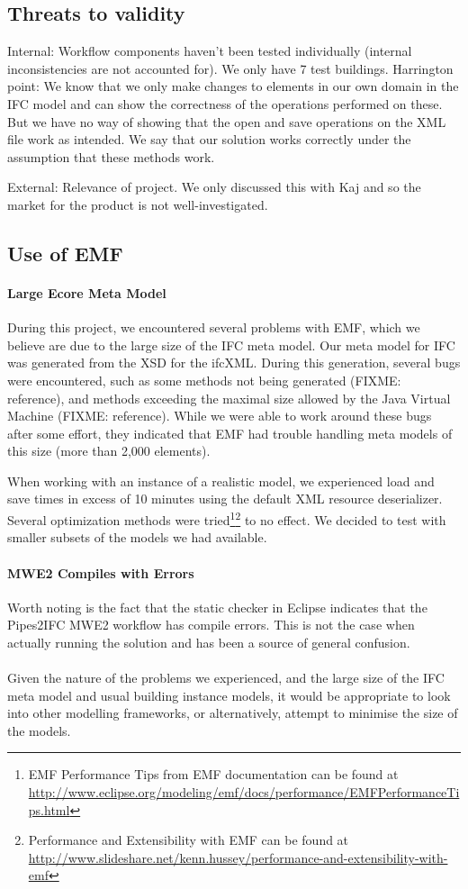 \subsection{Threats to validity}
Internal:
Workflow components haven't been tested individually (internal inconsistencies are not accounted for). We only have 7 test buildings.
Harrington point: We know that we only make changes to elements in our own domain in the IFC model and can show the correctness of the operations performed on these. But we have no way of showing that the open and save operations on the XML file work as intended. We say that our solution works correctly under the assumption that these methods work.

External:
Relevance of project. We only discussed this with Kaj and so the market for the product is not well-investigated.

\subsection{Use of EMF}
\label{subsec:use_of_EMF}
\paragraph{Large Ecore Meta Model} During this project, we encountered several problems with EMF, which we believe are due to the large size of the IFC meta model. Our meta model for IFC was generated from the XSD for the ifcXML. During this generation, several bugs were encountered, such as some methods not being generated (FIXME: reference), and methods exceeding the maximal size allowed by the Java Virtual Machine (FIXME: reference). While we were able to work around these bugs after some effort, they indicated that EMF had trouble handling meta models of this size (more than 2,000 elements).

When working with an instance of a realistic model, we experienced load and save times in excess of 10 minutes using the default XML resource deserializer. Several optimization methods were tried\footnote{EMF Performance Tips from EMF documentation can be found at \url{http://www.eclipse.org/modeling/emf/docs/performance/EMFPerformanceTips.html}}\footnote{Performance and Extensibility with EMF can be found at \url{http://www.slideshare.net/kenn.hussey/performance-and-extensibility-with-emf}} to no effect. We decided to test with smaller subsets of the models we had available.

\paragraph{MWE2 Compiles with Errors} Worth noting is the fact that the static checker in Eclipse indicates that the Pipes2IFC MWE2 workflow has compile errors. This is not the case when actually running the solution and has been a source of general confusion.
\paragraph{}
Given the nature of the problems we experienced, and the large size of the IFC meta model and usual building instance models, it would be appropriate to look into other modelling frameworks, or alternatively, attempt to minimise the size of the models.
